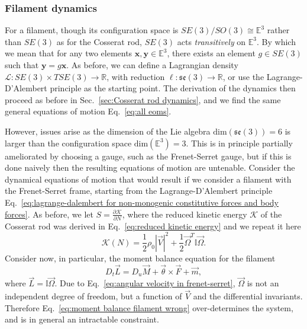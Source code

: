\subsubsection*{Filament dynamics}

For a filament, though its configuration space is $SE(3)/SO(3) \cong \mathbb{E}^3$ rather than $SE(3)$ as for the Cosserat rod, $SE(3)$ acts \textit{transitively} on $\mathbb{E}^3$. By which we mean that for any two elements $\mathbf{x}, \mathbf{y} \in \mathbb{E}^3$, there exists an element $g \in SE(3)$ such that $\mathbf{y} = g \mathbf{x}$. As before, we can define a Lagrangian density $\mathcal{L} : SE(3) \times TSE(3) \to \mathbb{R}$, with reduction $\ell : \mathfrak{se}(3) \to \mathbb{R}$, or use the Lagrange-D'Alembert principle as the starting point. The derivation of the dynamics then proceed as before in Sec.~\ref{sec:Cosserat rod dynamics}, and we find the same general equations of motion Eq.~\ref{eq:all eoms}.

However, issues arise as the dimension of the Lie algebra $\text{dim}(\mathfrak{se}(3)) = 6$ is larger than the configuration space $\text{dim}(\mathbb{E}^3) = 3$. This is in principle partially ameliorated by choosing a gauge, such as the Frenet-Serret gauge, but if this is done naively then the resulting equations of motion are untenable. Consider the dynamical equations of motion that would result if we consider a filament with the Frenet-Serret frame, starting from the Lagrange-D'Alembert principle Eq.~\ref{eq:lagrange-dalembert for non-monogenic constitutive forces and body forces}. As before, we let $S = \frac{\partial \mathcal{K}}{\partial N}$, where the reduced kinetic energy $\mathcal{K}$ of the Cosserat rod was derived in Eq.~\ref{eq:reduced kinetic energy} and we repeat it here
\begin{equation}
\mathcal{K}(N)  = \frac{1}{2} \rho_0 |\vec{V}|^2 +  \frac{1}{2} \vec{\Omega}^T \mathbb{I} \vec{\Omega}.
\end{equation}
Consider now, in particular, the moment balance equation for the filament
\begin{equation} \label{eq:moment balance filament wrong}
D_t \vec{L} = D_u \vec{M} + \vec{\theta} \times \vec{F} + \vec{m},
\end{equation}
where $\vec{L} = \mathbb{I} \vec{\Omega}$. Due to Eq.~\ref{eq:angular velocity in frenet-serret}, $\vec{\Omega}$ is not an independent degree of freedom, but a function of $\vec{V}$ and the differential invariants. Therefore Eq.~\ref{eq:moment balance filament wrong} over-determines the system, and is in general an intractable constraint.

